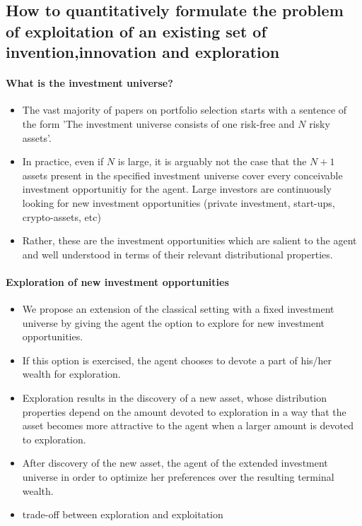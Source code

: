 \subsection{How to quantitatively formulate the problem of exploitation of an
existing set of invention,innovation and exploration}

\paragraph{What is the investment universe?}

\begin{itemize}
    \item The vast majority of papers on portfolio selection starts with a
        sentence of the form 'The investment universe consists of one risk-free
        and $N$ risky assets'.
    \item In practice, even if $N$ is large, it is arguably not the case that
        the $N+1$ assets present in the specified investment universe cover
        every conceivable investment opportunitiy for the agent. Large investors
        are continuously looking for new investment opportunities (private
        investment, start-ups, crypto-assets, etc)
    \item Rather, these are the investment opportunities which are salient
        to the agent and well understood in terms of their relevant distributional
        properties.
\end{itemize}

\paragraph{Exploration of new investment opportunities}
\begin{itemize}
    \item We propose an extension of the classical setting with a fixed
        investment universe by giving the agent the option to explore for new
        investment opportunities.
    \item If this option is exercised, the agent chooses to devote a part of
        his/her wealth for exploration.
    \item Exploration results in the discovery of a new asset, whose distribution
        properties depend on the amount devoted to exploration in a way that the
        asset becomes more attractive to the agent when a larger amount is devoted
        to exploration.
    \item After discovery of the new asset, the agent of the extended investment
        universe in order to optimize her preferences over the resulting
        terminal wealth.
    \item trade-off between exploration and exploitation
\end{itemize}

